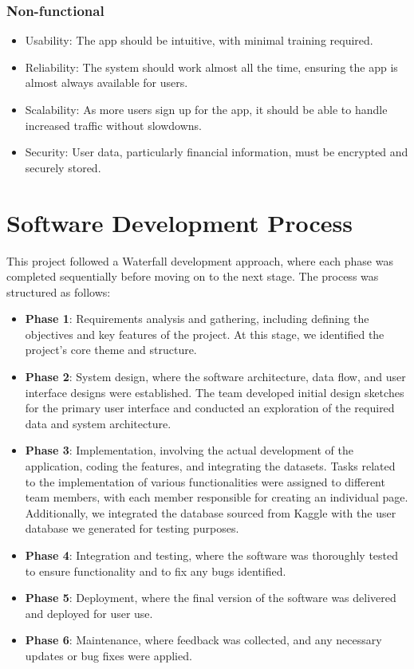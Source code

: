 \documentclass{article}
\begin{document}
\subsubsection{Non-functional}
\begin{itemize}
    \item Usability: The app should be intuitive, with minimal training required.
    \item Reliability: The system should work almost all the time, ensuring the app is almost always available for users.
    \item Scalability: As more users sign up for the app, it should be able to handle increased traffic without slowdowns.
    \item Security: User data, particularly financial information, must be encrypted and securely stored.
\end{itemize}


\section{Software Development Process}
This project followed a Waterfall development approach, where each phase was completed sequentially before moving on to the next stage. The process was structured as follows:
\begin{itemize}
    \item \textbf{Phase 1}: Requirements analysis and gathering, including defining the objectives and key features of the project. At this stage, we identified the project's core theme and structure.
    \item \textbf{Phase 2}: System design, where the software architecture, data flow, and user interface designs were established. The team developed initial design sketches for the primary user interface and conducted an exploration of the required data and system architecture.
    \item \textbf{Phase 3}: Implementation, involving the actual development of the application, coding the features, and integrating the datasets. Tasks related to the implementation of various functionalities were assigned to different team members, with each member responsible for creating an individual page. Additionally, we integrated the database sourced from Kaggle with the user database we generated for testing purposes.
    \item \textbf{Phase 4}: Integration and testing, where the software was thoroughly tested to ensure functionality and to fix any bugs identified.
    \item \textbf{Phase 5}: Deployment, where the final version of the software was delivered and deployed for user use.
    \item \textbf{Phase 6}: Maintenance, where feedback was collected, and any necessary updates or bug fixes were applied.
\end{itemize}
\end{document}
